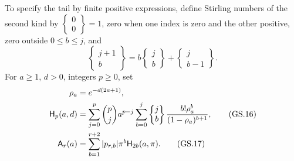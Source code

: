 \documentclass[11pt]{article}
\begin{document}
To specify the tail by finite positive expressions, define Stirling
numbers of the second kind by
$\left\{\begin{smallmatrix}0\\0\end{smallmatrix}\right\}=1$,
zero when one index is zero and the other positive, zero outside
$0\le b\le j$, and
\[
 \left\{\begin{matrix}j+1\\b\end{matrix}\right\}
 =b\left\{\begin{matrix}j\\b\end{matrix}\right\}
  +\left\{\begin{matrix}j\\b-1\end{matrix}\right\}.
\]
For $a\ge1$, $d>0$, integers $p\ge0$, set
\begin{align}
 \rho_a&=e^{-d(2a+1)},\notag\\
 \mathsf H_p(a,d)&=\sum_{j=0}^p\binom pj a^{p-j}
 \sum_{b=0}^j\left\{\begin{matrix}j\\b\end{matrix}\right\}
       \frac{b!\rho_a^b}{(1-\rho_a)^{b+1}},\tag{GS.16}\\
 \mathsf A_r(a)&=\sum_{b=1}^{r+2}|p_{r,b}|\pi^b
                         \mathsf H_{2b}(a,\pi).\tag{GS.17}
\end{align}
\end{document}

